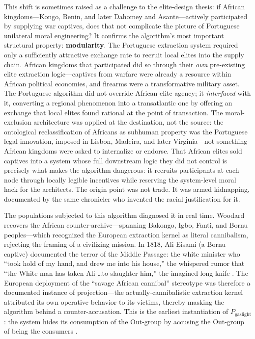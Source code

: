 This shift is sometimes raised as a challenge to the elite-design thesis: if African kingdoms---Kongo, Benin, and later Dahomey and Asante---actively participated by supplying war captives, does that not complicate the picture of Portuguese unilateral moral engineering? It confirms the algorithm's most important structural property: \textbf{modularity}. The Portuguese extraction system required only a sufficiently attractive exchange rate to recruit local elites into the supply chain. African kingdoms that participated did so through their \textit{own} pre-existing elite extraction logic---captives from warfare were already a resource within African political economies, and firearms were a transformative military asset. The Portuguese algorithm did not override African elite agency; it \textit{interfaced} with it, converting a regional phenomenon into a transatlantic one by offering an exchange that local elites found rational at the point of transaction. The moral-exclusion architecture was applied at the destination, not the source: the ontological reclassification of Africans as subhuman property was the Portuguese legal innovation, imposed in Lisbon, Madeira, and later Virginia---not something African kingdoms were asked to internalize or endorse. That African elites sold captives into a system whose full downstream logic they did not control is precisely what makes the algorithm dangerous: it recruits participants at each node through locally legible incentives while reserving the system-level moral hack for the architects. The origin point was not trade. It was armed kidnapping, documented by the same chronicler who invented the racial justification for it.

The populations subjected to this algorithm diagnosed it in real time. Woodard recovers the African counter-archive---spanning Bakongo, Igbo, Fanti, and Bornu peoples---which recognized the European extraction kernel as literal cannibalism, rejecting the framing of a civilizing mission. In 1818, Ali Eisami (a Bornu captive) documented the terror of the Middle Passage: the white minister who ``took hold of my hand, and drew me into his house,'' the whispered rumor that ``the White man has taken Ali \dots to slaughter him,'' the imagined long knife \cite{curtin_africa}. The European deployment of the ``savage African cannibal'' stereotype was therefore a documented instance of projection---the actually-cannibalistic extraction kernel attributed its own operative behavior to its victims, thereby masking the algorithm behind a counter-accusation. This is the earliest instantiation of $P_{\text{gaslight}}$: the system hides its consumption of the Out-group by accusing the Out-group of being the consumers \cite{woodard_delectable}.


